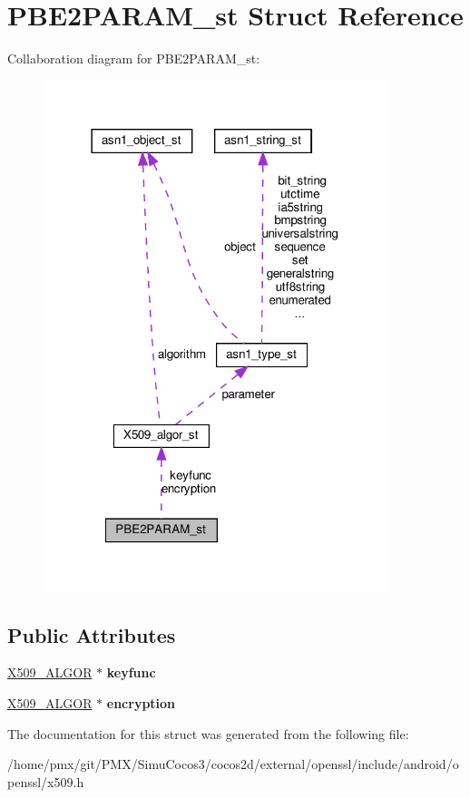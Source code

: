 \hypertarget{structPBE2PARAM__st}{}\section{P\+B\+E2\+P\+A\+R\+A\+M\+\_\+st Struct Reference}
\label{structPBE2PARAM__st}


Collaboration diagram for P\+B\+E2\+P\+A\+R\+A\+M\+\_\+st\+:
\nopagebreak
\begin{figure}[H]
\begin{center}
\leavevmode
\includegraphics[width=285pt]{structPBE2PARAM__st__coll__graph}
\end{center}
\end{figure}
\subsection*{Public Attributes}
\begin{DoxyCompactItemize}
\item 
\mbox{\label{structPBE2PARAM__st_a7e6b6c8d602992f0b307aef30bca4595}} 
\hyperlink{structX509__algor__st}{X509\+\_\+\+A\+L\+G\+OR} $\ast$ {\bfseries keyfunc}
\item 
\mbox{\label{structPBE2PARAM__st_a5c797d3eec7dd618e7aa69bfff051f01}} 
\hyperlink{structX509__algor__st}{X509\+\_\+\+A\+L\+G\+OR} $\ast$ {\bfseries encryption}
\end{DoxyCompactItemize}


The documentation for this struct was generated from the following file\+:\begin{DoxyCompactItemize}
\item 
/home/pmx/git/\+P\+M\+X/\+Simu\+Cocos3/cocos2d/external/openssl/include/android/openssl/x509.\+h\end{DoxyCompactItemize}
